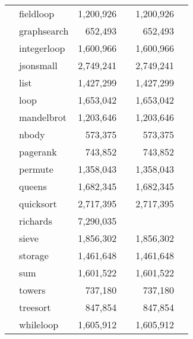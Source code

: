 \begin{tabular}{ll@{\hspace{6pt}}r@{\hspace{3pt}}l@{\hspace{6pt}}r@{\hspace{3pt}}l}
 & fieldloop & 1,200,926 &  & 1,200,926 &  \\
 & graphsearch & 652,493 &  & 652,493 &  \\
 & integerloop & 1,600,966 &  & 1,600,966 &  \\
 & jsonsmall & 2,749,241 &  & 2,749,241 &  \\
 & list & 1,427,299 &  & 1,427,299 &  \\
 & loop & 1,653,042 &  & 1,653,042 &  \\
 & mandelbrot & 1,203,646 &  & 1,203,646 &  \\
 & nbody & 573,375 &  & 573,375 &  \\
 & pagerank & 743,852 &  & 743,852 &  \\
 & permute & 1,358,043 &  & 1,358,043 &  \\
 & queens & 1,682,345 &  & 1,682,345 &  \\
 & quicksort & 2,717,395 &  & 2,717,395 &  \\
 & richards & 7,290,035 &  &  &  \\
 & sieve & 1,856,302 &  & 1,856,302 &  \\
 & storage & 1,461,648 &  & 1,461,648 &  \\
 & sum & 1,601,522 &  & 1,601,522 &  \\
 & towers & 737,180 &  & 737,180 &  \\
 & treesort & 847,854 &  & 847,854 &  \\
 & whileloop & 1,605,912 &  & 1,605,912 &  \\
\bottomrule
\end{tabular}